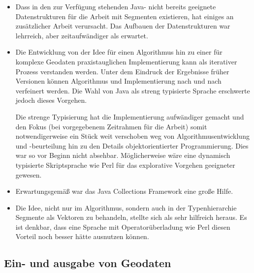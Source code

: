 \documentclass[../main/thesis.tex]{subfiles}
\begin{document}
\begin{itemize}

\item
Dass in den zur Verfügung stehenden Java- nicht bereits geeignete Datenstrukturen für die Arbeit mit Segmenten existieren, hat einiges an zusätzlicher Arbeit verursacht.
Das Aufbauen der Datenstrukturen war lehrreich, aber zeitaufwändiger als erwartet.

\item
Die Entwicklung von der Idee für einen Algorithmus hin zu einer für komplexe Geodaten praxistauglichen Implementierung kann als iterativer Prozess verstanden werden.
Unter dem Eindruck der Ergebnisse früher Versionen können Algorithmus und Implementierung nach und nach verfeinert werden.
Die Wahl von Java als streng typisierte Sprache erschwerte jedoch dieses Vorgehen.

Die strenge Typisierung hat die Implementierung aufwändiger gemacht und den Fokus (bei vorgegebenem Zeitrahmen für die Arbeit) somit notwendigerweise ein Stück weit verschoben weg von Algorithmusentwicklung und -beurteilung hin zu den Details objektorientierter Programmierung.
Dies war so vor Beginn nicht absehbar.
Möglicherweise wäre eine dynamisch typisierte Skriptsprache wie Perl für das explorative Vorgehen geeigneter gewesen.

\item
Erwartungsgemäß war das Java Collections Framework eine große Hilfe.

\item
Die Idee, nicht nur im Algorithmus, sondern auch in der Typenhierarchie Segmente als Vektoren zu behandeln, stellte sich als sehr hilfreich heraus.
Es ist denkbar, dass eine Sprache mit Operatorüberladung wie Perl diesen Vorteil noch besser hätte ausnutzen können.

\end{itemize}



\subsection{Ein- und ausgabe von Geodaten}
\end{document}
